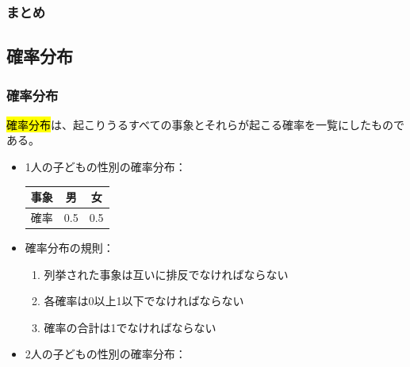 
\begin{frame}
\frametitle{まとめ}



\end{frame}


\subsection{確率分布}


\begin{frame}
\frametitle{確率分布}

\hl{確率分布}は、起こりうるすべての事象とそれらが起こる確率を一覧にしたものである。

\begin{itemize}
\item 1人の子どもの性別の確率分布：
{\footnotesize
\begin{center}
\begin{tabular}{r | c | c}
事象    & 男		& 女 \\
\hline
確率	& 0.5		& 0.5 \\
\end{tabular}
\end{center}
}

\item 確率分布の規則：
\begin{enumerate}
\item 列挙された事象は互いに排反でなければならない
\item 各確率は0以上1以下でなければならない
\item 確率の合計は1でなければならない
\end{enumerate}

\item 2人の子どもの性別の確率分布：

\end{itemize}

\end{frame}


